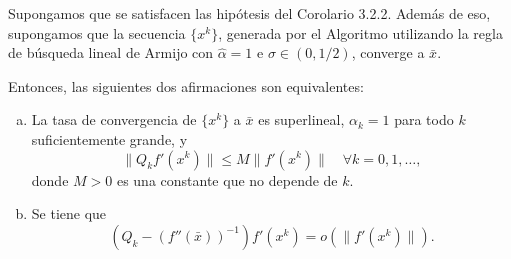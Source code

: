 \begin{theorem}\label{thm:dennis_more}
    Supongamos que se satisfacen las hipótesis del Corolario 3.2.2. Además de eso, supongamos que la secuencia $\{x^k\}$, generada por el Algoritmo utilizando la regla de búsqueda lineal de Armijo con $\hat{\alpha} = 1$ e $\sigma \in (0, 1/2)$, converge a $\bar{x}$.
    
    Entonces, las siguientes dos afirmaciones son equivalentes:
    \begin{enumerate}[(a)]
        \item La tasa de convergencia de $\{x^k\}$ a $\bar{x}$ es superlineal, $\alpha_k = 1$ para todo $k$ suficientemente grande, y 
        \begin{equation}
            \|Q_k f'(x^k)\| \le M \|f'(x^k)\| \quad \forall k = 0, 1, \dots,
            \label{eq:dennis_more_a}
        \end{equation}
        donde $M > 0$ es una constante que no depende de $k$.
        
        \item Se tiene que
        \begin{equation}
            (Q_k - (f''(\bar{x}))^{-1})f'(x^k) = o(\|f'(x^k)\|).
            \label{eq:dennis_more_b}
        \end{equation}
    \end{enumerate}
\end{theorem}

